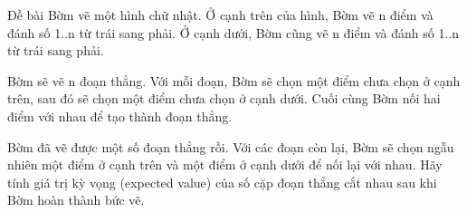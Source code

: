 Đề bài
Bờm vẽ một hình chữ nhật. Ở cạnh trên của hình, Bờm vẽ n điểm và đánh số 1..n từ trái sang phải. Ở cạnh dưới, Bờm cũng vẽ n điểm và đánh số 1..n từ trái sang phải.  

   Bờm sẽ vẽ n đoạn thẳng. Với mỗi đoạn, Bờm sẽ chọn một điểm chưa chọn ở cạnh trên, sau đó sẽ chọn một điểm chưa chọn ở cạnh dưới. Cuối cùng Bờm nối hai điểm với nhau để tạo thành đoạn thẳng.  

   Bờm đã vẽ được một số đoạn thẳng rồi. Với các đoạn còn lại, Bờm sẽ chọn ngẫu nhiên một điểm ở cạnh trên và một điểm ở cạnh dưới để nối lại với nhau. Hãy tính giá trị kỳ vọng (expected value) của số cặp đoạn thẳng cắt nhau sau khi Bờm hoàn thành bức vẽ.